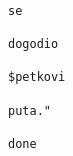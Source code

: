 \documentclass{exam}
\begin{document}
\begin{itemize}
\begin{lstlisting}
                                                                                                                                se
                                                                                                                                dogodio
                                                                                                                                $petkovi
                                                                                                                                puta."
                                                                                                                                done
                                                                                                                                \end{lstlisting}
                                                                                                                                \end{itemize}
\end{document}
